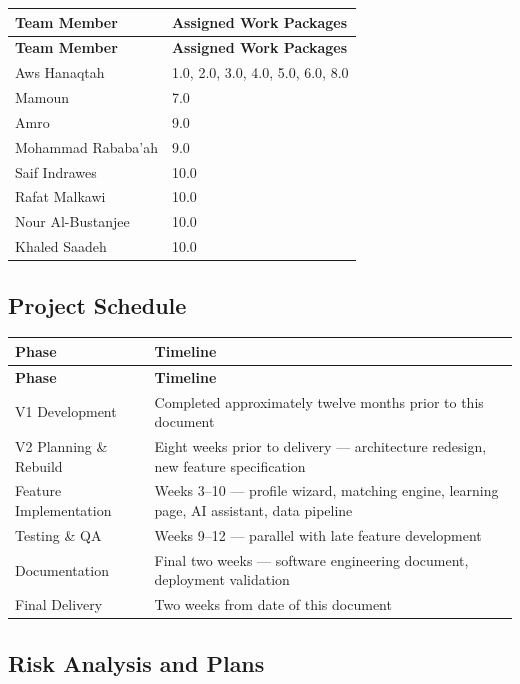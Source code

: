\documentclass[12pt,a4paper]{article}
\begin{document}
\begin{longtable}{@{} L{3.5cm} L{11cm} @{}}
\toprule
\textbf{Team Member} & \textbf{Assigned Work Packages} \\
\midrule
\endfirsthead
\toprule
\textbf{Team Member} & \textbf{Assigned Work Packages} \\
\midrule
\endhead
\bottomrule
\endlastfoot
Aws Hanaqtah        & 1.0, 2.0, 3.0, 4.0, 5.0, 6.0, 8.0 \\[2pt]
Mamoun              & 7.0 \\[2pt]
Amro                & 9.0 \\[2pt]
Mohammad Rababa'ah  & 9.0 \\[2pt]
Saif Indrawes       & 10.0 \\[2pt]
Rafat Malkawi       & 10.0 \\[2pt]
Nour Al-Bustanjee   & 10.0 \\[2pt]
Khaled Saadeh       & 10.0 \\
\end{longtable}

\subsection{Project Schedule}

\begin{longtable}{@{} L{4.5cm} L{10cm} @{}}
\toprule
\textbf{Phase} & \textbf{Timeline} \\
\midrule
\endfirsthead
\toprule
\textbf{Phase} & \textbf{Timeline} \\
\midrule
\endhead
\bottomrule
\endlastfoot
V1 Development          & Completed approximately twelve months prior to this document \\[2pt]
V2 Planning \& Rebuild  & Eight weeks prior to delivery --- architecture redesign, new feature specification \\[2pt]
Feature Implementation  & Weeks 3--10 --- profile wizard, matching engine, learning page, AI assistant, data pipeline \\[2pt]
Testing \& QA           & Weeks 9--12 --- parallel with late feature development \\[2pt]
Documentation           & Final two weeks --- software engineering document, deployment validation \\[2pt]
Final Delivery          & Two weeks from date of this document \\
\end{longtable}

\subsection{Risk Analysis and Plans}
\end{document}
